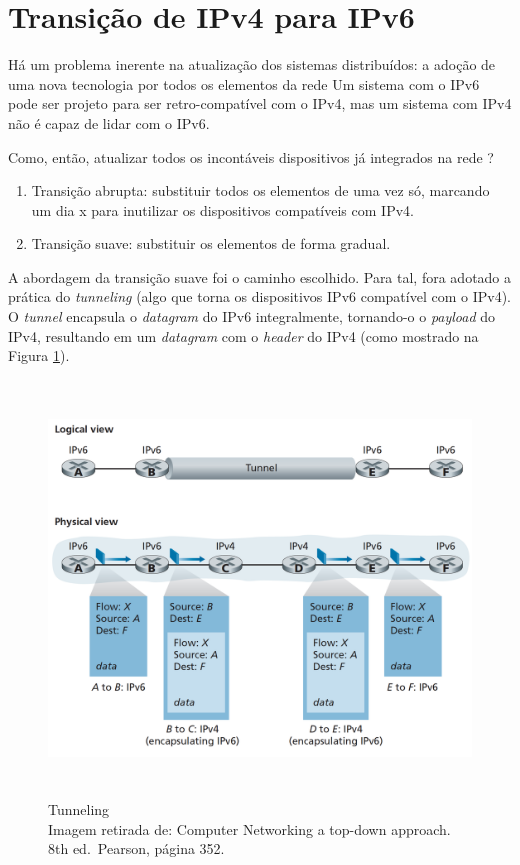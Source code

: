 \hypertarget{transiuxe7uxe3o-de-ipv4-para-ipv6}{%
\section{Transição de IPv4 para IPv6}\label{transiuxe7uxe3o-de-ipv4-para-ipv6}}

Há um problema inerente na atualização dos sistemas distribuídos: a
adoção de uma nova tecnologia por todos os elementos da rede Um sistema
com o IPv6 pode ser projeto para ser retro-compatível com o IPv4, mas um
sistema com IPv4 não é capaz de lidar com o IPv6.

Como, então, atualizar todos os incontáveis dispositivos já integrados
na rede ?

\begin{enumerate}
\def\labelenumi{\arabic{enumi}.}
\tightlist
\item
  Transição abrupta: substituir todos os elementos de uma vez só,
  marcando um dia x para inutilizar os dispositivos compatíveis com
  IPv4.
\item
  Transição suave: substituir os elementos de forma gradual.
\end{enumerate}

A abordagem da transição suave foi o caminho escolhido. Para tal, fora
adotado a prática do \emph{tunneling} (algo que torna os dispositivos
IPv6 compatível com o IPv4). O \emph{tunnel} encapsula o \emph{datagram}
do IPv6 integralmente, tornando-o o \emph{payload} do IPv4, resultando
em um \emph{datagram} com o \emph{header} do IPv4 (como mostrado na Figura \ref{Tunneling}).


\begin{figure}[h!]
\centering
\includegraphics[keepaspectratio, width=14cm, height=11cm]{imagens/13/13 - Tunneling.png}
\caption{Tunneling \\
Imagem retirada de: Computer Networking a top-down approach. 8th
ed.~Pearson, página 352. \\}
\label{Tunneling}
\end{figure}



